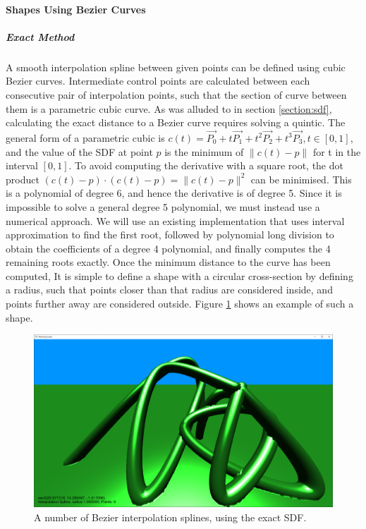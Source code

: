 \documentclass{article}
\begin{document}
\paragraph{Shapes Using Bezier Curves}
\subparagraph{Exact Method}
A smooth interpolation spline between given points can be defined using cubic Bezier curves. Intermediate control points are calculated between each consecutive pair of interpolation points, such that the section of curve between them is a parametric cubic curve. As was alluded to in section \ref{section:sdf}, calculating the exact distance to a Bezier curve requires solving a quintic. The general form of a parametric cubic is $c\left(t\right) = \vec{P_0} + t\vec{P_1} + t^2\vec{P_2} + t^3\vec{P_3}, t \in \left[0,1\right]$, and the value of the SDF at point $p$ is the minimum of $\| c\left(t\right) -p\|$ for t in the interval $\left[0,1\right]$. To avoid computing the derivative with a square root, the dot product $\left(c\left(t\right) -p\right) \cdot \left(c\left(t\right) -p\right) = \| c\left(t\right) -p\|^2$ can be minimised. This is a polynomial of degree 6, and hence the derivative is of degree 5. Since it is impossible to solve a general degree 5 polynomial, we must instead use a numerical approach. We will use an existing implementation\cite{kraus_2021} that uses interval approximation to find the first root, followed by polynomial long division to obtain the coefficients of a degree 4 polynomial, and finally computes the 4 remaining roots exactly. Once the minimum distance to the curve has been computed, It is simple to define a shape with a circular cross-section by defining a radius, such that points closer than that radius are considered inside, and points further away are considered outside. Figure \ref{fig:exact_bezier} shows an example of such a shape.

\begin{figure}[H]
  \includegraphics[width=\textwidth]{exact_bezier}
  \caption{A number of Bezier interpolation splines, using the exact SDF.}
  \label{fig:exact_bezier}
\end{figure}
\end{document}
